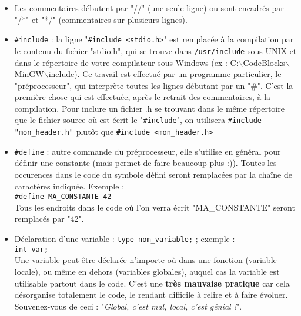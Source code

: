 \begin{itemize}
\item Les commentaires débutent par "//" (une seule ligne) ou sont encadrés par "/*" et "*/" (commentaires sur plusieurs lignes).\\

\item \lstinline{#include} : la ligne "\lstinline{#include <stdio.h>}" est remplacée à la compilation par le contenu du fichier "stdio.h", qui se trouve dans \texttt{/usr/include} sous UNIX et dans le répertoire de votre compilateur sous Windows (ex : C:$\backslash$CodeBlocks$\backslash$MinGW$\backslash$include). Ce travail est effectué par un programme particulier, le "préprocesseur", qui interprète toutes les lignes débutant par un "\#". C'est la première chose qui est effectuée, après le retrait des commentaires, à la compilation. Pour inclure un fichier .h se trouvant dans le même répertoire que le fichier source où est écrit le "\lstinline{#include}", on utilisera \lstinline{#include "mon_header.h"} plutôt que \lstinline{#include <mon_header.h>}\\

\item \lstinline{#define} : autre commande du préprocesseur, elle s'utilise en général pour définir une constante (mais permet de faire beaucoup plus :)). Toutes les occurences dans le code du symbole défini seront remplacées par la chaîne de caractères indiquée. Exemple :\\
\lstinline{#define MA_CONSTANTE 42}\\
Tous les endroits dans le code où l'on verra écrit "MA\_CONSTANTE" seront remplacés par "42".

\item Déclaration d'une variable : \lstinline{type nom_variable;} ; exemple :\\
\lstinline{int var;}\\
Une variable peut être déclarée n'importe où dans une fonction (variable locale), ou même en dehors (variables globales), auquel cas la variable est utilisable partout dans le code. C'est une \textbf{très mauvaise pratique} car cela désorganise totalement le code, le rendant difficile à relire et à faire évoluer.\\
Souvenez-vous de ceci : "\textit{Global, c'est mal, local, c'est génial !}".


\end{itemize}
